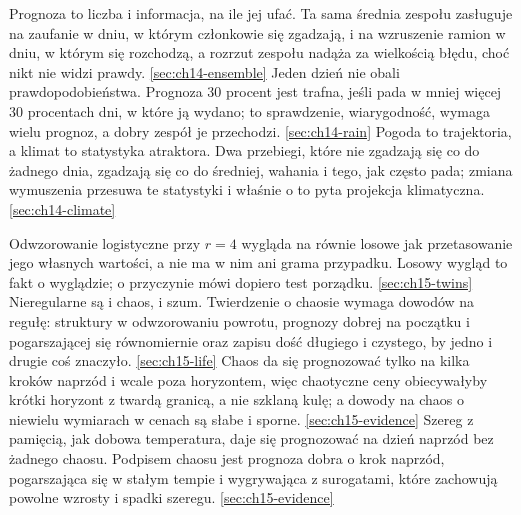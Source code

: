 %
  {Prognoza to liczba i informacja, na ile jej ufać. Ta sama średnia zespołu zasługuje na zaufanie w dniu, w którym członkowie się zgadzają, i na wzruszenie ramion w dniu, w którym się rozchodzą, a rozrzut zespołu nadąża za wielkością błędu, choć nikt nie widzi prawdy.}%
  {\ref{sec:ch14-ensemble}}
%
  {Jeden dzień nie obali prawdopodobieństwa. Prognoza 30 procent jest trafna, jeśli pada w mniej więcej 30 procentach dni, w które ją wydano; to sprawdzenie, wiarygodność, wymaga wielu prognoz, a dobry zespół je przechodzi.}%
  {\ref{sec:ch14-rain}}
%
  {Pogoda to trajektoria, a klimat to statystyka atraktora. Dwa przebiegi, które nie zgadzają się co do żadnego dnia, zgadzają się co do średniej, wahania i tego, jak często pada; zmiana wymuszenia przesuwa te statystyki i właśnie o to pyta projekcja klimatyczna.}%
  {\ref{sec:ch14-climate}}

%
  {Odwzorowanie logistyczne przy $r = 4$ wygląda na równie losowe jak przetasowanie jego własnych wartości, a nie ma w nim ani grama przypadku. Losowy wygląd to fakt o wyglądzie; o przyczynie mówi dopiero test porządku.}%
  {\ref{sec:ch15-twins}}
%
  {Nieregularne są i chaos, i szum. Twierdzenie o chaosie wymaga dowodów na regułę: struktury w odwzorowaniu powrotu, prognozy dobrej na początku i pogarszającej się równomiernie oraz zapisu dość długiego i czystego, by jedno i drugie coś znaczyło.}%
  {\ref{sec:ch15-life}}
%
  {Chaos da się prognozować tylko na kilka kroków naprzód i wcale poza horyzontem, więc chaotyczne ceny obiecywałyby krótki horyzont z twardą granicą, a nie szklaną kulę; a dowody na chaos o niewielu wymiarach w cenach są słabe i sporne.}%
  {\ref{sec:ch15-evidence}}
%
  {Szereg z pamięcią, jak dobowa temperatura, daje się prognozować na dzień naprzód bez żadnego chaosu. Podpisem chaosu jest prognoza dobra o krok naprzód, pogarszająca się w stałym tempie i wygrywająca z surogatami, które zachowują powolne wzrosty i spadki szeregu.}%
  {\ref{sec:ch15-evidence}}

